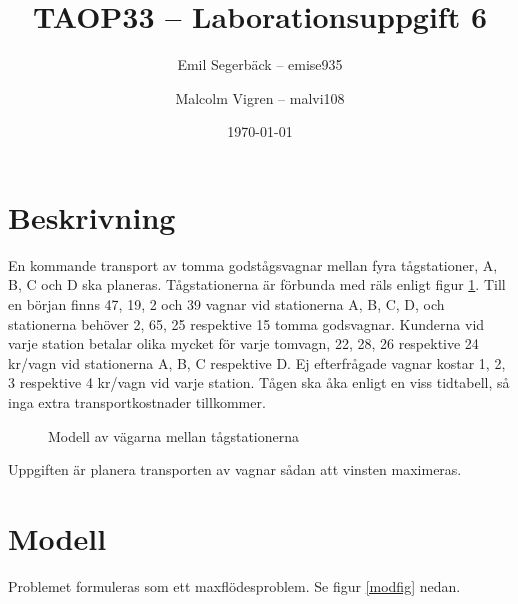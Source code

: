 \documentclass[a4paper,titlepage,12pt]{article}
\author{Emil Segerbäck -- emise935
    \and
    Malcolm Vigren -- malvi108
    }
\title{\textbf{TAOP33 -- Laborationsuppgift 6}}
\date{\today}
\begin{document}
	\maketitle
	\newpage
\section*{Beskrivning}
En kommande transport av tomma godstågsvagnar mellan fyra tågstationer, A, B, C
och D ska planeras. Tågstationerna är förbunda med räls enligt figur \ref{trackfig}.
Till en början finns 47, 19, 2 och 39 vagnar vid stationerna A, B, C, D, och
stationerna behöver 2, 65, 25 respektive 15 tomma godsvagnar. Kunderna vid
varje station betalar olika mycket för varje tomvagn, 22, 28, 26 respektive 24
kr/vagn vid stationerna A, B, C respektive D. Ej efterfrågade vagnar kostar 1,
2, 3 respektive 4 kr/vagn vid varje station. Tågen ska åka enligt en viss
tidtabell, så inga extra transportkostnader tillkommer.
\begin{figure}[h]
    \begin{centering}
        \caption{Modell av vägarna mellan tågstationerna\label{trackfig}}
    \end{centering}
\end{figure}

Uppgiften är planera transporten av vagnar sådan att vinsten maximeras.

\section*{Modell}
Problemet formuleras som ett maxflödesproblem. Se figur \ref{modfig} nedan.
\end{document}
